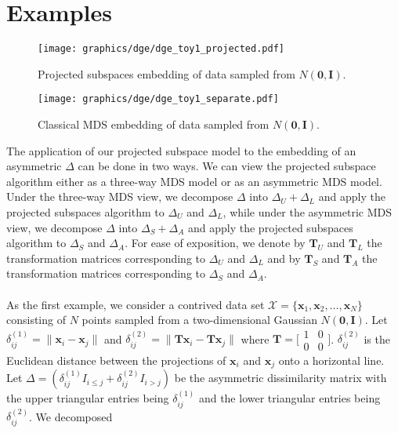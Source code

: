 \section{Examples}
\label{sec:examples}
\begin{figure}[htbp]
  \centering
  \texttt{[image: graphics/dge/dge\_toy1\_projected.pdf]}
  \caption{Projected subspaces embedding of data sampled from
    $N(\mathbf{0}, \mathbf{I})$. }
  \label{fig:toy1_projected}
\end{figure}
\begin{figure}
  \centering
  \texttt{[image: graphics/dge/dge\_toy1\_separate.pdf]}
  \caption{Classical MDS embedding of data sampled from $N(\mathbf{0},
    \mathbf{I})$.}
  \label{fig:toy1_cmds}
\end{figure}
%
%
The application of our projected subspace model to the embedding of
an asymmetric $\Delta$ can be done in two ways. We can view the
projected subspace algorithm either as a three-way MDS model or as an
asymmetric MDS model. Under the three-way MDS view, we decompose
$\Delta$ into $\Delta_U + \Delta_L$ and apply the projected subspaces
algorithm to $\Delta_U$ and $\Delta_L$, while under the asymmetric MDS
view, we decompose $\Delta$ into $\Delta_S + \Delta_A$ and apply the
projected subspaces algorithm to $\Delta_S$ and $\Delta_A$. For ease
of exposition, we denote by $\mathbf{T}_U$ and $\mathbf{T}_L$ the
transformation matrices corresponding to $\Delta_U$ and $\Delta_L$ and
by $\mathbf{T}_S$ and $\mathbf{T}_A$ the transformation matrices
corresponding to $\Delta_S$ and $\Delta_A$.  \\ \\
\noindent
As the first example, we consider a contrived data set $\mathcal{X} =
\{\mathbf{x}_1, \mathbf{x}_2, \dots, \mathbf{x}_N\}$ consisting of $N$
points sampled from a two-dimensional Gaussian $N(\mathbf{0},
\mathbf{I})$. Let $\delta_{ij}^{(1)} = \| \mathbf{x}_i - \mathbf{x}_j
\|$ and $\delta_{ij}^{(2)} = \| \mathbf{T}\mathbf{x}_i -
\mathbf{T}\mathbf{x}_j \|$ where $\mathbf{T} =
\bigl[\begin{smallmatrix} 1 & 0 \\ 0 & 0 \end{smallmatrix}
\bigr]$. $\delta_{ij}^{(2)}$ is the Euclidean distance between the
projections of $\mathbf{x}_i$ and $\mathbf{x}_j$ onto a horizontal
line. Let $\Delta = (\delta_{ij}^{(1)} I_{i \leq j} +
\delta_{ij}^{(2)} I_{i > j})$ be the asymmetric dissimilarity matrix
with the upper triangular entries being $\delta_{ij}^{(1)}$ and the
lower triangular entries being $\delta_{ij}^{(2)}$. We decomposed
